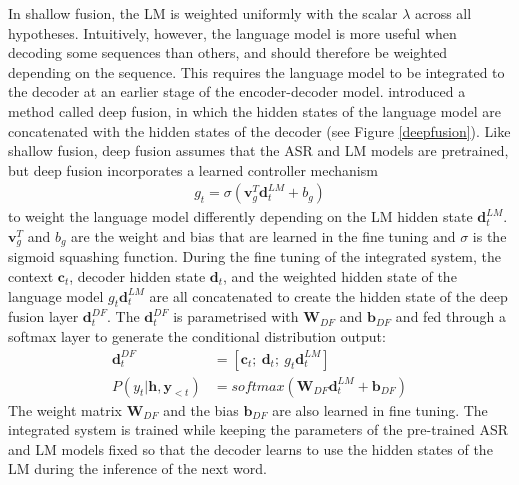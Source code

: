 \documentclass[11pt]{article}
\begin{document}
In shallow fusion, the LM is weighted uniformly with the scalar $\lambda$ across all hypotheses. Intuitively, however, the language model is more useful when decoding some sequences than others, and should therefore be weighted depending on the sequence. This requires the language model to be integrated to the decoder at an earlier stage of the encoder-decoder model. \citet{gulcehre2015using} introduced a method called deep fusion, in which the hidden states of the language model are concatenated with the hidden states of the decoder (see Figure \ref{deepfusion}). Like shallow fusion, deep fusion assumes that the ASR and LM models are pretrained, but deep fusion incorporates a learned controller mechanism
\begin{align}
    g_t = \sigma(\boldsymbol{v}_g^T\boldsymbol{d}_t^{LM}+b_g)
\end{align}
to weight the language model differently depending on the LM hidden state $\boldsymbol{d}_t^{LM}$. $\boldsymbol{v}_g^T$ and $b_g$ are the weight and bias that are learned in the fine tuning and $\sigma$ is the sigmoid squashing function. During the fine tuning of the integrated system, the context $\boldsymbol{c}_t$, decoder hidden state $\boldsymbol{d}_t$, and the weighted hidden state of the language model $g_t\boldsymbol{d}_t^{LM}$ are all concatenated to create the hidden state of the deep fusion layer $\boldsymbol{d}_t^{DF}$. The $\boldsymbol{d}_t^{DF}$ is parametrised with $\boldsymbol{W}_{DF}$ and $\boldsymbol{b}_{DF}$ and fed through a softmax layer to generate the conditional distribution output:
\begin{align}
    \boldsymbol{d}_t^{DF} &= [\boldsymbol{c}_t; \ \boldsymbol{d}_t; \ g_t\boldsymbol{d}_t^{LM}] \\
    P(y_t|\boldsymbol{h}, \boldsymbol{y}_{<t}) &= softmax(\boldsymbol{W}_{DF} \boldsymbol{d}_t^{LM} + \boldsymbol{b}_{DF})
\end{align}
The weight matrix $\boldsymbol{W}_{DF}$ and the bias $\boldsymbol{b}_{DF}$ are also learned in fine tuning. The integrated system is trained while keeping the parameters of the pre-trained ASR and LM models fixed so that the decoder learns to use the hidden states of the LM during the inference of the next word.
\end{document}
